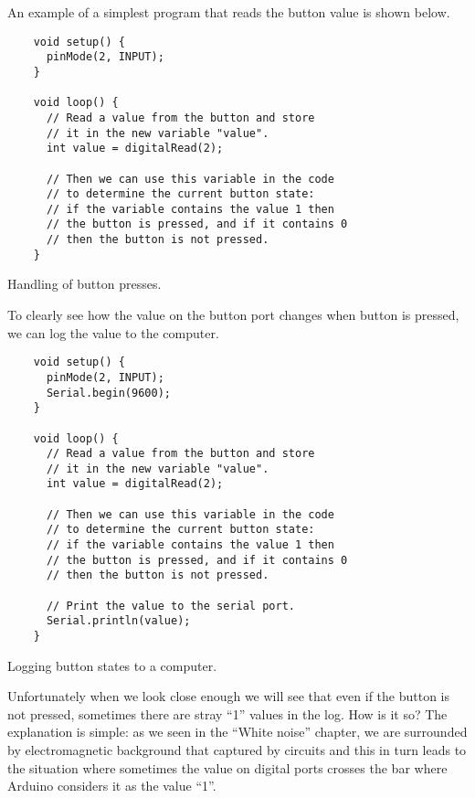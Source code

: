 \documentclass[../sparc.tex]{subfiles}
\begin{document}
An example of a simplest program that reads the button value is shown below.

\begin{listing}[H]
  \begin{verbatim}
    void setup() {
      pinMode(2, INPUT);
    }

    void loop() {
      // Read a value from the button and store
      // it in the new variable "value".
      int value = digitalRead(2);

      // Then we can use this variable in the code
      // to determine the current button state:
      // if the variable contains the value 1 then
      // the button is pressed, and if it contains 0
      // then the button is not pressed.
    }
  \end{verbatim}
  \caption{Handling of button presses.}
  \label{listing:button-00}
\end{listing}

To clearly see how the value on the button port changes when button is pressed,
we can log the value to the computer.

\begin{listing}[H]
  \begin{verbatim}
    void setup() {
      pinMode(2, INPUT);
      Serial.begin(9600);
    }

    void loop() {
      // Read a value from the button and store
      // it in the new variable "value".
      int value = digitalRead(2);

      // Then we can use this variable in the code
      // to determine the current button state:
      // if the variable contains the value 1 then
      // the button is pressed, and if it contains 0
      // then the button is not pressed.

      // Print the value to the serial port.
      Serial.println(value);
    }
  \end{verbatim}
  \caption{Logging button states to a computer.}
  \label{listing:button-01}
\end{listing}

Unfortunately when we look close enough we will see that even if the button is
not pressed, sometimes there are stray ``1'' values in the log.  How is it so?
The explanation is simple: as we seen in the ``White noise'' chapter, we are
surrounded by electromagnetic background that captured by circuits and this in
turn leads to the situation where sometimes the value on digital ports crosses
the bar where Arduino considers it as the value ``1''.
\end{document}
